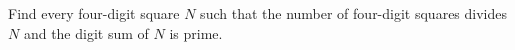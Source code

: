 Find every four-digit square $N$ such that the number of four-digit squares divides $N$ and the digit sum of $N$ is prime.
